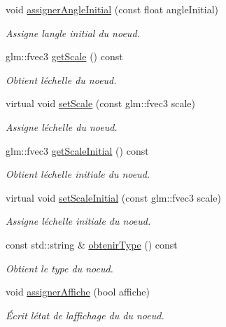 \begin{DoxyCompactItemize}
void \hyperlink{group__inf2990_gaf0e7fd3676087b70949012a945000509}{assigner\+Angle\+Initial} (const float angle\+Initial)
\begin{DoxyCompactList}\small\item\em Assigne l\textquotesingle{}angle initial du noeud. \end{DoxyCompactList}\item 
glm\+::fvec3 \hyperlink{group__inf2990_ga153a0490acbbaeda4647496e51d37894}{get\+Scale} () const 
\begin{DoxyCompactList}\small\item\em Obtient l\textquotesingle{}échelle du noeud. \end{DoxyCompactList}\item 
virtual void \hyperlink{group__inf2990_gaef8fd99796f85418adac496160a3350b}{set\+Scale} (const glm\+::fvec3 scale)
\begin{DoxyCompactList}\small\item\em Assigne l\textquotesingle{}échelle du noeud. \end{DoxyCompactList}\item 
glm\+::fvec3 \hyperlink{group__inf2990_gab229ec2d195c9e9bfa1a4c0f80b582ca}{get\+Scale\+Initial} () const 
\begin{DoxyCompactList}\small\item\em Obtient l\textquotesingle{}échelle initiale du noeud. \end{DoxyCompactList}\item 
virtual void \hyperlink{group__inf2990_gae51f2e4da1ff9308a55324d4aafd72db}{set\+Scale\+Initial} (const glm\+::fvec3 scale)
\begin{DoxyCompactList}\small\item\em Assigne l\textquotesingle{}échelle initiale du noeud. \end{DoxyCompactList}\item 
const std\+::string \& \hyperlink{group__inf2990_ga2df7c53ab456cc88bce73f7eb913e3e6}{obtenir\+Type} () const 
\begin{DoxyCompactList}\small\item\em Obtient le type du noeud. \end{DoxyCompactList}\item 
void \hyperlink{group__inf2990_gad5205d1e1b63fb66175a8580261d5eea}{assigner\+Affiche} (bool affiche)
\begin{DoxyCompactList}\small\item\em Écrit l\textquotesingle{}état de l\textquotesingle{}affichage du du noeud. \end{DoxyCompactList}\item 

\end{DoxyCompactItemize}
